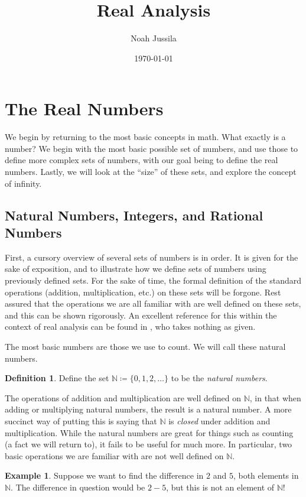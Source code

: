 \documentclass{article}
\title{Real Analysis}
\author{Noah Jussila}
\date{\today}
\newcommand{\N}{\mathbb{N}}
\theoremstyle{definition}
\newtheorem{definition}{Definition}[section]
\newtheorem{example}{Example}[section]
\begin{document}
	\maketitle
	
	\tableofcontents



\section{The Real Numbers}
We begin by returning to the most basic concepts in math. What exactly is a number? We begin with the most basic possible set of numbers, and use those to define more complex sets of numbers, with our goal being to define the real numbers. Lastly, we will look at the ``size'' of these sets, and explore the concept of infinity. 
\subsection{Natural Numbers, Integers, and Rational Numbers}
First, a cursory overview of several sets of numbers is in order. It is given for the sake of exposition, and to illustrate how we define sets of numbers using previously defined sets. For the sake of time, the formal definition of the standard operations (addition, multiplication, etc.) on these sets will be forgone. Rest assured that the operations we are all familiar with are well defined on these sets, and this can be shown rigorously. An excellent reference for this within the context of real analysis can be found in \cite{tao2006analysis}, who takes nothing as given. 

 The most basic numbers are those we use to count. We will call these natural numbers. \begin{definition}
Define the set $ \N\coloneqq\{0,1,2,\ldots\} $ to be the \textit{{\color{red} natural numbers}}. 
\end{definition}
\noindent The operations of addition and multiplication are well defined on $ \N $, in that when adding or multiplying natural numbers, the result is a natural number. A more succinct way of putting this is saying that $ \N $ is \textit{closed} under addition and multiplication. While the natural numbers are great for things such as counting (a fact we will return to), it fails to be useful for much more. In particular, two basic operations we are familiar with are not well defined on $ \N $.
\begin{example}\label{ex1}
	Suppose we want to find the difference in $ 2 $ and $ 5 $, both elements in $ \N $. The difference in question would be $ 2-5 $, but this is not an element of $ \N $! 
\end{example}
\end{document}
